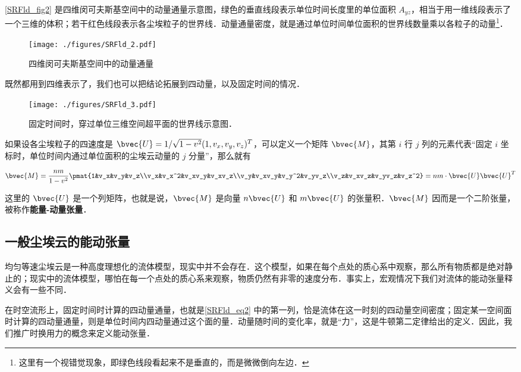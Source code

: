 \autoref{SRFld_fig2} 是四维闵可夫斯基空间中的动量通量示意图，绿色的垂直线段表示单位时间长度里的单位面积 $A_{yz}$，相当于用一维线段表示了一个三维的体积；若干红色线段表示各尘埃粒子的世界线．动量通量密度，就是通过单位时间单位面积的世界线数量乘以各粒子的动量\footnote{这里有一个视错觉现象，即绿色线段看起来不是垂直的，而是微微倒向左边．}．

\begin{figure}[ht]
\centering
\texttt{[image: ./figures/SRFld\_2.pdf]}
\caption{四维闵可夫斯基空间中的动量通量} \label{SRFld_fig2}
\end{figure}

既然都用到四维表示了，我们也可以把结论拓展到四动量，以及固定时间的情况．

\begin{figure}[ht]
\centering
\texttt{[image: ./figures/SRFld\_3.pdf]}
\caption{固定时间时，穿过单位三维空间超平面的世界线示意图．} \label{SRFld_fig3}
\end{figure}

如果设各尘埃粒子的四速度是 $\bvec{U}=1/\sqrt{1-v^2}(1, v_x, v_y, v_z)^T$，可以定义一个矩阵 $\bvec{M}$，其第 $i$ 行 $j$ 列的元素代表“固定 $i$ 坐标时，单位时间内通过单位面积的尘埃云动量的 $j$ 分量”，那么就有

\begin{equation}\label{SRFld_eq2}
\bvec{M}=\frac{nm}{1-v^2}\pmat{1&v_x&v_y&v_z\\v_x&v_x^2&v_xv_y&v_xv_z\\v_y&v_xv_y&v_y^2&v_yv_z\\v_z&v_xv_z&v_yv_z&v_z^2}=nm\cdot\bvec{U}\bvec{U}^T
\end{equation}

这里的 $\bvec{U}$ 是一个列矩阵，也就是说，$\bvec{M}$ 是向量 $n\bvec{U}$ 和 $m\bvec{U}$ 的张量积．$\bvec{M}$ 因而是一个二阶张量，被称作\textbf{能量-动量张量}．


\subsection{一般尘埃云的能动张量}

均匀等速尘埃云是一种高度理想化的流体模型，现实中并不会存在．这个模型，如果在每个点处的质心系中观察，那么所有物质都是绝对静止的；现实中的流体模型，哪怕在每一个点处的质心系来观察，物质仍然有非零的速度分布．事实上，宏观情况下我们对流体的能动张量释义会有一些不同．

在时空流形上，固定时间时计算的四动量通量，也就是\autoref{SRFld_eq2} 中的第一列，恰是流体在这一时刻的四动量空间密度；固定某一空间面时计算的四动量通量，则是单位时间内四动量通过这个面的量．动量随时间的变化率，就是“力”，这是牛顿第二定律给出的定义．因此，我们推广时换用力的概念来定义能动张量．

